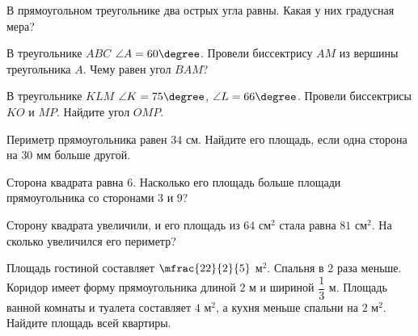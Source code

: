\begin{class}[number=5]
	\begin{listofex}
		\item В прямоугольном треугольнике два острых угла равны. Какая у них градусная мера?
		\item В треугольнике \( ABC \) \( \angle A=60\degree \). Провели биссектрису \( AM \) из вершины треугольника \( A \). Чему равен угол \( BAM \)?
		\item В треугольнике \( KLM \) \( \angle K=75\degree \), \(\angle L=66\degree \). Провели биссектрисы \( KO \) и \( MP \). Найдите угол \( OMP \).
		\item Периметр прямоугольника равен \( 34 \) см. Найдите его площадь, если одна сторона на \( 30 \) мм больше другой.
		\item Сторона квадрата равна \( 6 \). Насколько его площадь больше площади прямоугольника со сторонами \( 3 \) и \( 9 \)?
		\item Сторону квадрата увеличили, и его площадь из \( 64 \) см\( ^2 \) стала равна \( 81 \) см\( ^2 \). На сколько увеличился его периметр?
		\item Площадь гостиной составляет \( \mfrac{22}{2}{5} \) м\( ^2 \). Спальня в \( 2 \) раза меньше. Коридор имеет форму прямоугольника длиной \( 2 \) м и шириной \( \dfrac{1}{3} \) м. Площадь ванной комнаты и туалета составляет \( 4 \) м\( ^2 \), а кухня меньше спальни на \( 2 \) м\( ^2 \). Найдите площадь всей квартиры.
		\item {}
	\end{listofex}
\end{class}

